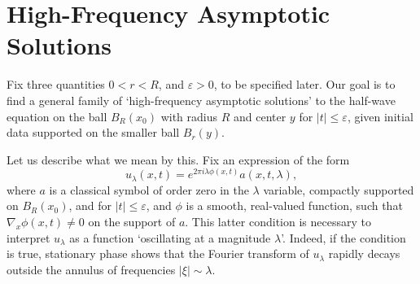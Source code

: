\documentclass{article}
\theoremstyle{plain}
\theoremstyle{remark}
\theoremstyle{definition}
\DeclareMathOperator{\RR}{\mathbb{R}}
\begin{document}
\section{High-Frequency Asymptotic Solutions}

Fix three quantities $0 < r < R$, and $\varepsilon > 0$, to be specified later. Our goal is to find a general family of `high-frequency asymptotic solutions' to the half-wave equation on the ball $B_R(x_0)$ with radius $R$ and center $y$ for $|t| \leq \varepsilon$, given initial data supported on the smaller ball $B_r(y)$.


Let us describe what we mean by this. Fix an expression of the form
%
\[ u_\lambda(x,t) = e^{2 \pi i \lambda \phi(x,t)} a(x,t,\lambda), \]
%
where $a$ is a classical symbol of order zero in the $\lambda$ variable, compactly supported on $B_R(x_0)$, and for $|t| \leq \varepsilon$, and $\phi$ is a smooth, real-valued function, such that $\nabla_x \phi(x,t) \neq 0$ on the support of $a$. This latter condition is necessary to interpret $u_\lambda$ as a function `oscillating at a magnitude $\lambda$'. Indeed, if the condition is true, stationary phase shows that the Fourier transform of $u_\lambda$ rapidly decays outside the annulus of frequencies $|\xi| \sim \lambda$.

%

%
%
%
\end{document}
